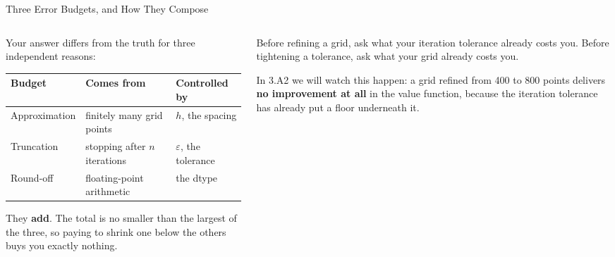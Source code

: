 \begin{frame}{Three Error Budgets, and How They Compose}
\begin{columns}[T]
\begin{column}{0.54\textwidth}
\small
Your answer differs from the truth for three independent reasons:
\medskip
\begin{center}\footnotesize
\begin{tabularx}{\linewidth}{@{}>{\raggedright\arraybackslash}p{2.1cm} >{\raggedright\arraybackslash}X >{\raggedright\arraybackslash}p{1.9cm}@{}}
\toprule
\textbf{Budget} & \textbf{Comes from} & \textbf{Controlled by} \\
\midrule
Approximation & finitely many grid points & $h$, the spacing \\
Truncation & stopping after $n$ iterations & $\varepsilon$, the tolerance \\
Round-off & floating-point arithmetic & the dtype \\
\bottomrule
\end{tabularx}
\end{center}
\medskip
They \textbf{add}. The total is no smaller than the largest of the three, so paying to shrink one below the others buys you exactly nothing.
\end{column}
\begin{column}{0.43\textwidth}
\begin{conceptbox}[title=\textbf{A rule you can apply today}]\small
Before refining a grid, ask what your iteration tolerance already costs you. Before tightening a tolerance, ask what your grid already costs you.
\end{conceptbox}
\medskip
\begin{examplebox}\footnotesize
In 3.A2 we will watch this happen: a grid refined from 400 to 800 points delivers \textbf{no improvement at all} in the value function, because the iteration tolerance has already put a floor underneath it.
\end{examplebox}
\end{column}
\end{columns}
\end{frame}


